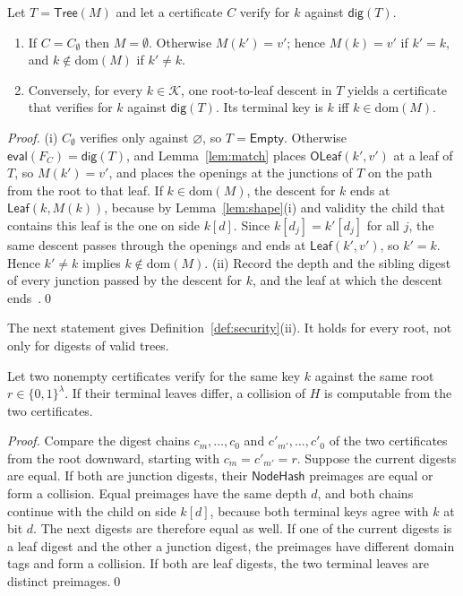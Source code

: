 \documentclass[runningheads]{llncs}
\newcommand{\NodeHash}{\mathsf{NodeHash}}
\newcommand{\dig}{\mathsf{dig}}
\newcommand{\Tree}{\mathsf{Tree}}
\newcommand{\Leaf}{\mathsf{Leaf}}
\newcommand{\Empty}{\mathsf{Empty}}
\newcommand{\eval}{\mathsf{eval}}
\newcommand{\OLeaf}{\mathsf{OLeaf}}
\newcommand{\dom}{\mathrm{dom}}
\newcommand{\K}{\mathcal{K}}
\begin{document}
\begin{theorem}\label{thm:cert}
Let $T = \Tree(M)$ and let a certificate $C$ verify for $k$ against $\dig(T)$.
\begin{enumerate}
\renewcommand{\labelenumi}{(\roman{enumi})}
  \item If $C = C_\emptyset$ then $M = \emptyset$. Otherwise $M(k') = v'$; hence $M(k) = v'$ if $k' = k$, and $k \notin \dom(M)$ if $k' \neq k$.
  \item Conversely, for every $k \in \K$, one root-to-leaf descent in $T$ yields a certificate that verifies for $k$ against $\dig(T)$. Its terminal key is $k$ iff $k \in \dom(M)$.
\end{enumerate}
\end{theorem}
\begin{proof}
(i) $C_\emptyset$ verifies only against $\varnothing$, so $T = \Empty$. Otherwise $\eval(F_C) = \dig(T)$, and Lemma~\ref{lem:match} places $\OLeaf(k',v')$ at a leaf of $T$, so $M(k') = v'$, and places the openings at the junctions of $T$ on the path from the root to that leaf. If $k \in \dom(M)$, the descent for $k$ ends at $\Leaf(k, M(k))$, because by Lemma~\ref{lem:shape}(i) and validity the child that contains this leaf is the one on side $k[d]$. Since $k[d_j] = k'[d_j]$ for all $j$, the same descent passes through the openings and ends at $\Leaf(k',v')$, so $k' = k$. Hence $k' \neq k$ implies $k \notin \dom(M)$. (ii) Record the depth and the sibling digest of every junction passed by the descent for $k$, and the leaf at which the descent ends~\cite{fullversion}.\qed
\end{proof}

The next statement gives Definition~\ref{def:security}(ii). It holds for every root, not only for digests of valid trees.

\begin{proposition}[Undeniability]\label{prop:undeniable}
Let two nonempty certificates verify for the same key $k$ against the same root $r \in \{0,1\}^{\lambda}$. If their terminal leaves differ, a collision of $H$ is computable from the two certificates.
\end{proposition}
\begin{proof}
Compare the digest chains $c_m, \ldots, c_0$ and $c'_{m'}, \ldots, c'_0$ of the two certificates from the root downward, starting with $c_m = c'_{m'} = r$. Suppose the current digests are equal. If both are junction digests, their $\NodeHash$ preimages are equal or form a collision. Equal preimages have the same depth $d$, and both chains continue with the child on side $k[d]$, because both terminal keys agree with $k$ at bit $d$. The next digests are therefore equal as well. If one of the current digests is a leaf digest and the other a junction digest, the preimages have different domain tags and form a collision. If both are leaf digests, the two terminal leaves are distinct preimages.\qed
\end{proof}
\end{document}
